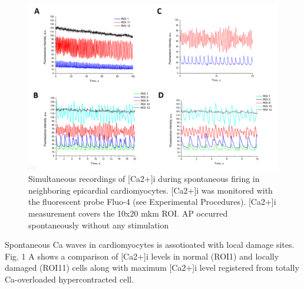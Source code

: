 \documentclass[a4paper,12pt]{article}
\begin{document}
\begin{figure}
    \includegraphics[width=\linewidth]{fig9.png}
    \caption{Simultaneous recordings of [Ca2+]i during spontaneous firing in neighboring epicardial cardiomyocytes. [Ca2+]i was monitored with the fluorescent probe Fluo-4 (see Experimental Procedures). [Ca2+]i measurement covers the 10x20 mkm ROI. AP occurred spontaneously without any stimulation}
    \label{fig:fig9}
\end{figure}

Spontaneous Ca waves in cardiomyocytes is assotioated with local damage sites.
Fig. 1 A shows a comparison of [Ca2+]i levels in normal (ROI1) and locally damaged (ROI11) cells along with maximum [Ca2+]i level registered from totally Ca-overloaded hypercontracted cell.
\end{document}
